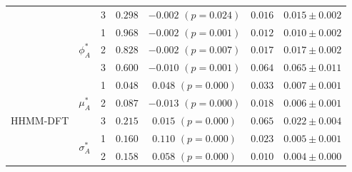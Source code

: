 \documentclass{article}
\begin{document}
\begin{center}
{\begin{tabular}{ccccccc}
                            &                               & 3                                & $0.298$                         & $-0.002$ $(p=0.024)$          & $0.016$                             & $0.015 \pm 0.002$                             \\
                            & \multirow{3}{*}{$\phi_A^*$}   & 1                                & $0.968$                         & $-0.002$ $(p=0.001)$          & $0.012$                             & $0.010 \pm 0.002$                             \\
                            &                               & 2                                & $0.828$                         & $-0.002$ $(p=0.007)$          & $0.017$                             & $0.017 \pm 0.002$                             \\
                            &                               & 3                                & $0.600$                         & $-0.010$ $(p=0.001)$          & $0.064$                             & $0.065 \pm 0.011$                             \\ \hline
\multirow{9}{*}{HHMM-DFT}   & \multirow{3}{*}{$\mu_A^*$}    & 1                                & $0.048$                         & $0.048$ $(p=0.000)$          & $0.033$                             & $0.007 \pm 0.001$                             \\
                            &                               & 2                                & $0.087$                         & $-0.013$ $(p=0.000)$          & $0.018$                             & $0.006 \pm 0.001$                             \\
                            &                               & 3                                & $0.215$                         & $0.015$ $(p=0.000)$          & $0.065$                             & $0.022 \pm 0.004$                             \\
                            & \multirow{3}{*}{$\sigma_A^*$} & 1                                & $0.160$                         & $0.110$ $(p=0.000)$          & $0.023$                             & $0.005 \pm 0.001$                             \\
                            &                               & 2                                & $0.158$                         & $0.058$ $(p=0.000)$          & $0.010$                             & $0.004 \pm 0.000$                             \\ 

\end{tabular}}
\end{center}
\end{document}
